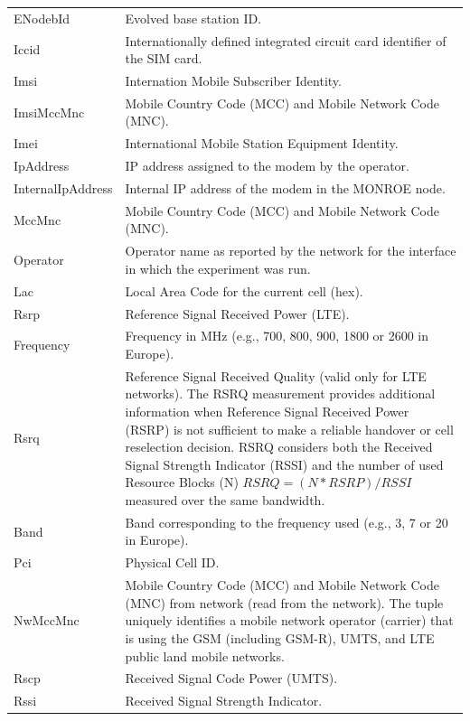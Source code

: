 \documentclass[a4paper,10pt]{article}
\newcommand{\monroe}{MONROE}
\begin{document}
\begin{appendices}
{\begin{longtable}{p{3cm}p{12cm}}
	ENodebId & Evolved base station ID.\\
	Iccid & Internationally defined integrated circuit card identifier of the SIM card.\\
	Imsi & Internation Mobile Subscriber Identity.\\
	ImsiMccMnc & Mobile Country Code (MCC) and Mobile Network Code (MNC).\\
	Imei & International Mobile Station Equipment Identity.\\
	IpAddress & IP address assigned to the modem by the operator.\\
	InternalIpAddress & Internal IP address of the modem in the \monroe{} node.\\
	MccMnc & Mobile Country Code (MCC) and Mobile Network Code (MNC).\\
	Operator & Operator name as reported by the network for the interface in which the experiment was run.\\
	Lac & Local Area Code for the current cell (hex).\\
	Rsrp & Reference Signal Received Power (LTE).\\
	Frequency & Frequency in \si{\mega\hertz} (e.g., \num{700}, \num{800}, \num{900}, \num{1800} or \num{2600} in Europe).\\
	Rsrq & Reference Signal Received Quality (valid only for LTE networks). The RSRQ measurement provides additional information when Reference Signal Received Power (RSRP) is not sufficient to make a reliable handover or cell reselection decision. RSRQ considers both the Received Signal Strength Indicator (RSSI) and the number of used Resource Blocks (N) $\mathit{RSRQ} = (N * \mathit{RSRP}) / \mathit{RSSI}$ measured over the same bandwidth.\\
	Band & Band corresponding to the frequency used (e.g., \num{3}, \num{7} or \num{20} in Europe).\\
	Pci & Physical Cell ID.\\
	NwMccMnc & Mobile Country Code (MCC) and Mobile Network Code (MNC) from network (read from the network). The tuple uniquely identifies a mobile network operator (carrier) that is using the GSM (including GSM-R), UMTS, and
	LTE public land mobile networks.\\
	Rscp & Received Signal Code Power (UMTS).\\
	Rssi & Received Signal Strength Indicator.\\
	\bottomrule
\end{longtable}
}


\end{appendices}
\end{document}
